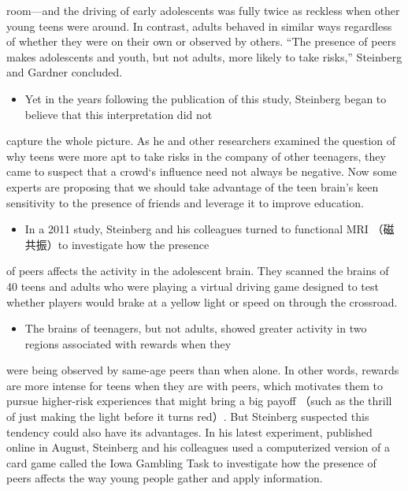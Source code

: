 \documentclass[UTF8,11pt]{ctexart}
\begin{document}
room—and the driving of early adolescents was fully twice as reckless when other young teens were around. In contrast, adults behaved in similar ways regardless of whether they were on their own or observed by others. “The presence of peers makes adolescents and youth, but not adults, more likely to take risks,” Steinberg and Gardner concluded.


\begin{itemize}[leftmargin=2em,itemsep=.2em,topsep=.4em]\item[D.] Yet in the years following the publication of this study, Steinberg began to believe that this interpretation did not
\end{itemize}

capture the whole picture. As he and other researchers examined the question of why teens were more apt to take risks in the company of other teenagers, they came to suspect that a crowd‘s influence need not always be negative. Now some experts are proposing that we should take advantage of the teen brain’s keen sensitivity to the presence of friends and leverage it to improve education.


\begin{itemize}[leftmargin=2em,itemsep=.2em,topsep=.4em]\item[E.] In a 2011 study, Steinberg and his colleagues turned to functional MRI （磁共振）to investigate how the presence
\end{itemize}

of peers affects the activity in the adolescent brain. They scanned the brains of 40 teens and adults who were playing a virtual driving game designed to test whether players would brake at a yellow light or speed on through the crossroad.


\begin{itemize}[leftmargin=2em,itemsep=.2em,topsep=.4em]\item[F.] The brains of teenagers, but not adults, showed greater activity in two regions associated with rewards when they
\end{itemize}

were being observed by same-age peers than when alone. In other words, rewards are more intense for teens when they are with peers, which motivates them to pursue higher-risk experiences that might bring a big payoff （such as the thrill of just making the light before it turns red）. But Steinberg suspected this tendency could also have its advantages. In his latest experiment, published online in August, Steinberg and his colleagues used a computerized version of a card game called the Iowa Gambling Task to investigate how the presence of peers affects the way young people gather and apply information.
\end{document}
